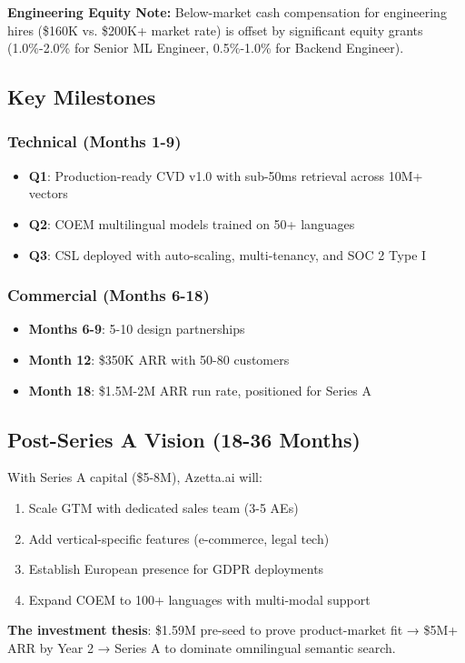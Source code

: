 \textbf{Engineering Equity Note:} Below-market cash compensation for engineering hires (\$160K vs. \$200K+ market rate) is offset by significant equity grants (1.0\%-2.0\% for Senior ML Engineer, 0.5\%-1.0\% for Backend Engineer).

\subsection{Key Milestones}

\subsubsection{Technical (Months 1-9)}
\begin{itemize}[noitemsep]
    \item \textbf{Q1}: Production-ready CVD v1.0 with sub-50ms retrieval across 10M+ vectors
    \item \textbf{Q2}: COEM multilingual models trained on 50+ languages
    \item \textbf{Q3}: CSL deployed with auto-scaling, multi-tenancy, and SOC 2 Type I
\end{itemize}

\subsubsection{Commercial (Months 6-18)}
\begin{itemize}[noitemsep]
    \item \textbf{Months 6-9}: 5-10 design partnerships
    \item \textbf{Month 12}: \$350K ARR with 50-80 customers
    \item \textbf{Month 18}: \$1.5M-2M ARR run rate, positioned for Series A
\end{itemize}

\subsection{Post-Series A Vision (18-36 Months)}

With Series A capital (\$5-8M), Azetta.ai will:
\begin{enumerate}[noitemsep]
    \item Scale GTM with dedicated sales team (3-5 AEs)
    \item Add vertical-specific features (e-commerce, legal tech)
    \item Establish European presence for GDPR deployments
    \item Expand COEM to 100+ languages with multi-modal support
\end{enumerate}

\vspace{0.5cm}

\textbf{The investment thesis}: \$1.59M pre-seed to prove product-market fit → \$5M+ ARR by Year 2 → Series A to dominate omnilingual semantic search.
